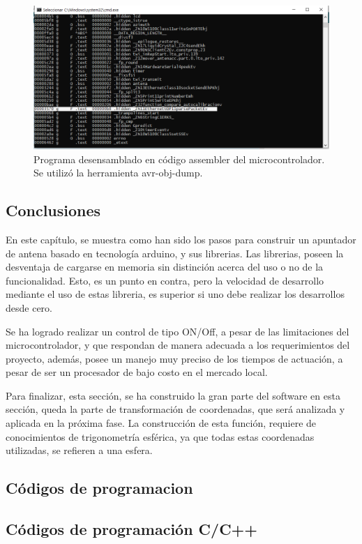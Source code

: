 \begin{figure}[ht]
	\includegraphics{dump_memory}
	\caption{Programa desensamblado en código assembler del microcontrolador. Se utilizó la herramienta avr-obj-dump. }
\end{figure}


\section{Conclusiones}


En este capítulo, se muestra como han sido los pasos para construir un apuntador de antena basado en tecnología arduino, y sus librerias. Las librerias, poseen la desventaja de cargarse en memoria sin distinción acerca del uso o no de la funcionalidad. Esto, es un punto en contra, pero la velocidad de desarrollo mediante el uso de estas libreria, es superior si uno debe realizar los desarrollos desde cero.  

Se ha logrado realizar un control de tipo ON/Off, a pesar de las limitaciones del microcontrolador, y que respondan de manera adecuada a los requerimientos del proyecto, además, posee un manejo muy preciso de los tiempos de actuación, a pesar de ser un procesador de bajo costo en el mercado local. 


Para finalizar, esta sección, se ha construido la gran parte del software en esta sección, queda la parte de transformación de coordenadas, que será analizada y aplicada en la próxima fase. La construcción de esta función, requiere de conocimientos de trigonometría esférica, ya que todas estas coordenadas utilizadas, se refieren a una esfera. 



\begin{appendices}

	\chapter{Códigos de programacion}
	\section{Códigos de programación C/C++} 
	
\end{appendices}
	